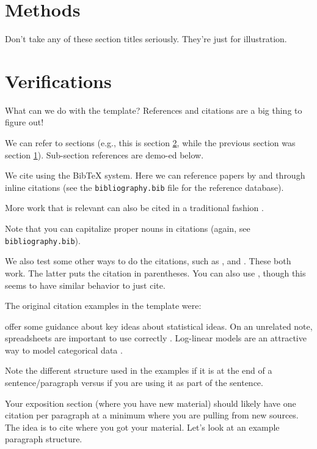 \documentclass[
  12pt]{article}
\begin{document}
\section{Methods}\label{sec-meth}

Don't take any of these section titles seriously. They're just for
illustration.

\section{Verifications}\label{sec-verify}

What can we do with the template? References and citations are a big
thing to figure out!

We can refer to sections (e.g., this is section \ref{sec-verify}, while
the previous section was section \ref{sec-meth}). Sub-section references
are demo-ed below.

We cite using the BibTeX system. Here we can reference papers by
\citet{Campbell02} and \citet{Schubert13} through inline citations (see
the \texttt{bibliography.bib} file for the reference database).

More work that is relevant can also be cited in a traditional fashion
\citep[\citet{Galyardt14mmm}, \citet{Galyardt12dis}]{Chi81}.

Note that you can capitalize proper nouns in citations
\citep{Campbell02} (again, see \texttt{bibliography.bib}).

We also test some other ways to do the citations, such as \cite{Chi81},
and \citep{Campbell02}. These both work. The latter puts the citation in
parentheses. You can also use \citet{Chi81}, though this seems to have
similar behavior to just cite.

The original citation examples in the template were:

\citet{gelm:veht:2021} offer some guidance about key ideas about
statistical ideas. On an unrelated note, spreadsheets are important to
use correctly \citep{brom:woo:2018}. Log-linear models are an attractive
way to model categorical data \citep{bish:fien:1975}.

Note the different structure used in the examples if it is at the end of
a sentence/paragraph versus if you are using it as part of the sentence.

Your exposition section (where you have new material) should likely have
one citation per paragraph at a minimum where you are pulling from new
sources. The idea is to cite where you got your material. Let's look at
an example paragraph structure.
\end{document}
